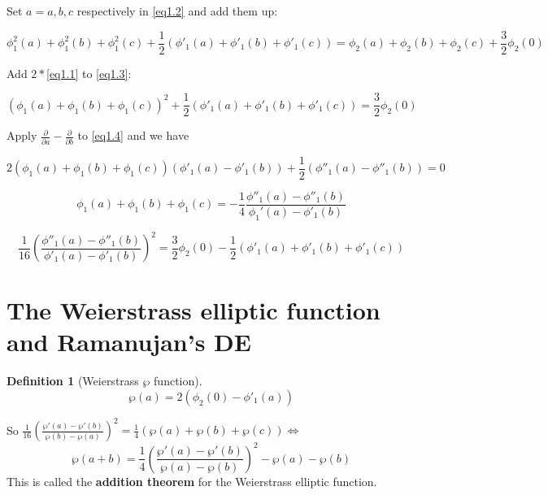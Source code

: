 \documentclass{article}
\newtheorem{Def}{Definition}[section]
\begin{document}
Set $a=a,b,c$ respectively in \ref{eq1.2} and add them up:

\begin{equation}
 \label{eq1.3}
\phi_1^2(a)+\phi_1^2(b)+\phi_1^2(c) + \frac{1}{2} \left( \phi'_1(a)+ \phi'_1(b) + \phi'_1(c) \right) = \phi_2(a) + \phi_2(b) + \phi_2(c) + \frac{3}{2}\phi_2(0)
\end{equation}

Add $2*$\ref{eq1.1} to \ref{eq1.3}:

\begin{equation}
 \label{eq1.4}
\left( \phi_1(a)+\phi_1(b)+\phi_1(c) \right)^2 + \frac{1}{2} \left( \phi'_1(a) + \phi'_1(b) + \phi'_1(c) \right) = \frac{3}{2}\phi_2(0)
\end{equation}


Apply $\frac{\partial }{\partial a} - \frac{\partial }{\partial b}$ to \ref{eq1.4} and we have

\begin{equation}
 \label{eq1.5}
2 \left( \phi_1(a)+\phi_1(b)+\phi_1(c) \right)(\phi'_1(a)- \phi'_1(b)) + \frac{1}{2} \left( \phi''_1(a)- \phi''_1(b) \right) = 0 
\end{equation}

\begin{equation}
 \label{eq1.6}
\phi_1(a)+ \phi_1(b) + \phi_1(c) = - \frac{1}{4} \frac{\phi''_1(a)- \phi''_1(b)}{\phi_1'(a) - \phi'_1(b)}
\end{equation}

\begin{equation}
 \label{eq1.7}
\frac{1}{16} \left( \frac{\phi''_1(a)- \phi''_1(b)}{\phi'_1(a)-\phi'_1(b)} \right)^2 = \frac{3}{2}\phi_2(0) - \frac{1}{2} \left( \phi'_1(a) + \phi'_1(b)+ \phi'_1(c) \right)
\end{equation}

\section{The Weierstrass elliptic function and Ramanujan's DE}

\begin{Def}[Weierstrass $\wp$ function]
 \[\wp(a) = 2 (\phi_2(0) - \phi'_1(a))\]
\end{Def}


So $ \frac{1}{16} \left( \frac{\wp'(a)-\wp'(b)}{\wp(b)-\wp(a)} \right)^2 = \frac{1}{4} \left( \wp(a)+\wp(b)+\wp(c) \right)\Leftrightarrow $
\begin{equation*}
\wp(a+b) = \frac{1}{4} \left( \frac{\wp'(a)-\wp'(b)}{\wp(a)-\wp(b)} \right)^2 - \wp(a)-\wp(b)
\end{equation*}
This is called the \textbf{addition theorem} for the Weierstrass elliptic function.
\end{document}
